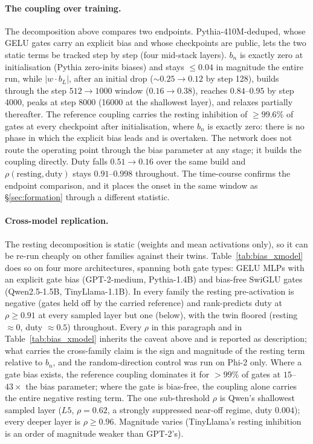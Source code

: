 \documentclass[11pt]{article}
\newcommand{\bl}{b_L}
\begin{document}
\paragraph{The coupling over training.} The decomposition above
compares two endpoints. Pythia-410M-deduped, whose GELU gates carry an
explicit bias and whose checkpoints are public, lets the two static
terms be tracked step by step (four mid-stack layers). $b_n$ is
exactly zero at initialisation (Pythia zero-inits biases) and stays
$\leq 0.04$ in magnitude the entire run, while $|w\cdot\bl|$, after
an initial drop ($\sim0.25 \to 0.12$ by step 128), builds through the step $512\to1000$ window ($0.16 \to 0.38$),
reaches $0.84$--$0.95$ by step 4000, peaks at step 8000 (16000 at
the shallowest layer), and relaxes partially thereafter. The reference coupling carries the resting inhibition of
$\geq 99.6\%$ of gates at every checkpoint after initialisation, where $b_n$ is exactly zero: there is no
phase in which the explicit bias leads and is overtaken. The network
does not route the operating point through the bias parameter at any
stage; it builds the coupling directly.
Duty falls
$0.51 \to 0.16$ over the same build and $\rho(\text{resting},
\text{duty})$ stays $0.91$--$0.998$ throughout. The time-course confirms
the endpoint comparison, and it places the onset in the same window as
\S\ref{sec:formation} through a different statistic.

\paragraph{Cross-model replication.} The resting decomposition is
static (weights and mean activations only), so it can be re-run
cheaply on other families against their twins.
Table~\ref{tab:bias_xmodel} does so on four more architectures,
spanning both gate types: GELU MLPs with an explicit gate bias
(GPT-2-medium, Pythia-1.4B) and bias-free SwiGLU gates (Qwen2.5-1.5B,
TinyLlama-1.1B). In every family the resting pre-activation is
negative (gates held off by the carried reference) and rank-predicts
duty at $\rho \geq 0.91$ at every sampled layer but one (below), with the twin
floored (resting $\approx 0$, duty $\approx 0.5$) throughout. Every
$\rho$ in this paragraph and in Table~\ref{tab:bias_xmodel} inherits
the caveat above and is reported as description; what carries the
cross-family claim is the sign and magnitude of the resting term
relative to $b_n$, and the random-direction control was run on Phi-2
only. Where a
gate bias exists, the reference coupling dominates it for $>99\%$ of
gates at $15$--$43\times$ the bias parameter; where the gate is
bias-free, the coupling alone carries the entire negative resting
term. The one sub-threshold $\rho$ is Qwen's shallowest sampled layer
($L5$, $\rho = 0.62$, a strongly suppressed near-off regime, duty
$0.004$); every deeper layer is $\rho \geq 0.96$. Magnitude varies
(TinyLlama's resting inhibition is an order of magnitude weaker than
GPT-2's).
\end{document}
